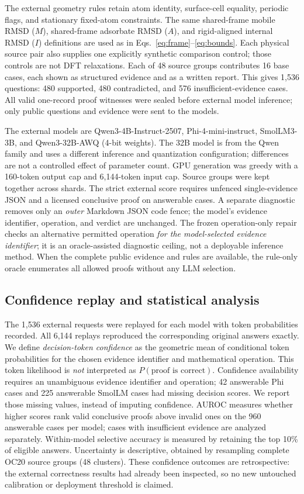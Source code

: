 The external geometry rules retain atom identity, surface-cell equality, periodic flags, and stationary fixed-atom constraints. The same shared-frame mobile RMSD ($M$), shared-frame adsorbate RMSD ($A$), and rigid-aligned internal RMSD ($I$) definitions are used as in Eqs.~\ref{eq:frame}--\ref{eq:bounds}. Each physical source pair also supplies one explicitly synthetic comparison control; those controls are not DFT relaxations. Each of 48 source groups contributes 16 base cases, each shown as structured evidence and as a written report. This gives 1,536 questions: 480 supported, 480 contradicted, and 576 insufficient-evidence cases. All valid one-record proof witnesses were sealed before external model inference; only public questions and evidence were sent to the models.

The external models are Qwen3-4B-Instruct-2507, Phi-4-mini-instruct, SmolLM3-3B, and Qwen3-32B-AWQ (4-bit weights). The 32B model is from the Qwen family and uses a different inference and quantization configuration; differences are not a controlled effect of parameter count. GPU generation was greedy with a 160-token output cap and 6,144-token input cap. Source groups were kept together across shards. The strict external score requires unfenced single-evidence JSON and a licensed conclusive proof on answerable cases. A separate diagnostic removes only an \emph{outer} Markdown JSON code fence; the model's evidence identifier, operation, and verdict are unchanged. The frozen operation-only repair checks an alternative permitted operation \emph{for the model-selected evidence identifier}; it is an oracle-assisted diagnostic ceiling, not a deployable inference method. When the complete public evidence and rules are available, the rule-only oracle enumerates all allowed proofs without any LLM selection.

\subsection{Confidence replay and statistical analysis}
\label{sec:confidence_methods}

The 1,536 external requests were replayed for each model with token probabilities recorded. All 6,144 replays reproduced the corresponding original answers exactly. We define \emph{decision-token confidence} as the geometric mean of conditional token probabilities for the chosen evidence identifier and mathematical operation. This token likelihood is \emph{not} interpreted as $P(\text{proof is correct})$. Confidence availability requires an unambiguous evidence identifier and operation; 42 answerable Phi cases and 225 answerable SmolLM cases had missing decision scores. We report those missing values, instead of imputing confidence. AUROC measures whether higher scores rank valid conclusive proofs above invalid ones on the 960 answerable cases per model; cases with insufficient evidence are analyzed separately. Within-model selective accuracy is measured by retaining the top 10\% of eligible answers. Uncertainty is descriptive, obtained by resampling complete OC20 source groups (48 clusters). These confidence outcomes are retrospective: the external correctness results had already been inspected, so no new untouched calibration or deployment threshold is claimed.